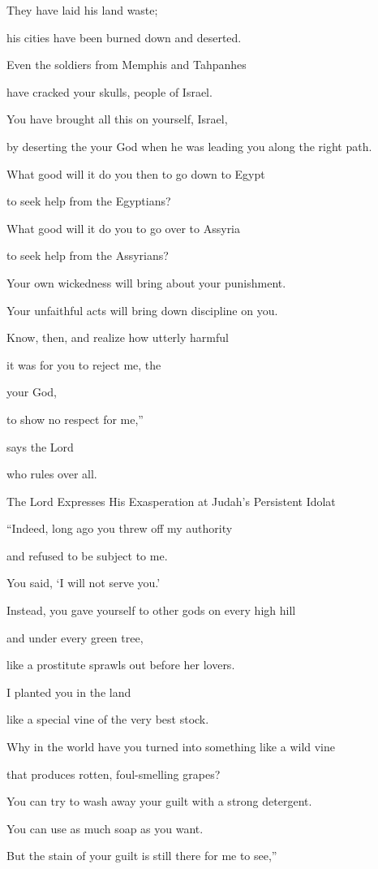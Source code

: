 {\par }{\Q They have laid his land
waste;
\par }{\Q his cities
have been burned
down and deserted.
\par }{\Q {}Even
the soldiers from Memphis
and Tahpanhes
\par }{\Q have cracked
your skulls, people of Israel.
\par }{\Q {}You have
brought all this
on yourself, Israel,

\par }{\Q by deserting
the {}
your God
when
he was leading
you along
the right path.
\par }{\Q {}What
good will it do you then to go down to
Egypt
\par }{\Q to seek help
from the Egyptians?

\par }{\Q What
good will it do you to go over
to Assyria
\par }{\Q to seek help
from the Assyrians?
\par }{\Q {}Your own wickedness
will bring about
your punishment.
\par }{\Q Your unfaithful acts
will bring down discipline
on you.

\par }{\Q Know,
then, and realize
how
utterly harmful
\par }{\Q it was for you to reject
me, the

{}
your God,
\par }{\Q to show
no
respect
for
me,”

\par }{\Q says
the Lord

{}
who rules over all.
\par }{\SH The Lord Expresses His Exasperation at Judah’s Persistent Idolat
\par }{\Q {}“Indeed,
long ago
you threw off
my authority
\par }{\Q and refused
to be subject to me.

\par }{\Q You said,
‘I will not
serve
you.’
\par }{\Q Instead,
you
gave yourself to other gods on
every
high
hill
\par }{\Q and under
every
green
tree,
\par }{\Q like a prostitute
sprawls out before her lovers.
\par }{\Q {}I
planted
you in the land
\par }{\Q like a special vine
of the very best stock.
\par }{\Q Why in the world have you turned
into something like a wild vine
\par }{\Q that produces rotten,
foul-smelling grapes?
\par }{\Q {}You can try to wash
away your guilt with a strong detergent.
\par }{\Q You can use as much
soap
as you want.
\par }{\Q But the stain
of your guilt
is still there for me to see,”

}
